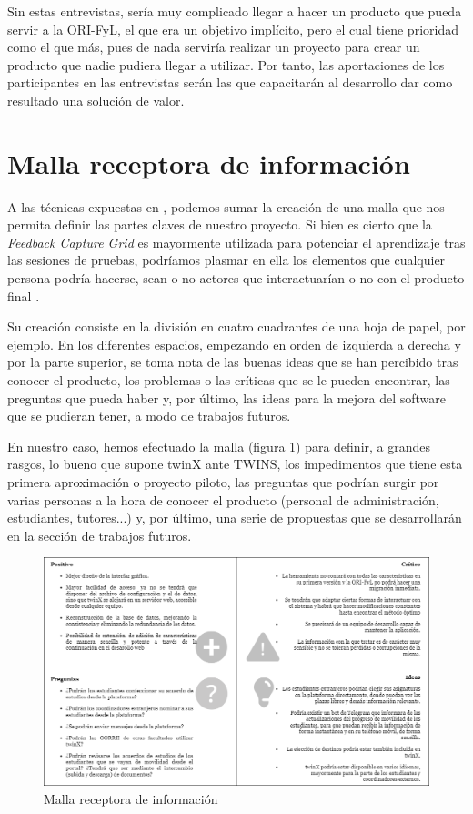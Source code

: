 Sin estas entrevistas, sería muy complicado llegar a hacer un producto que pueda servir a la ORI-FyL, el que era un objetivo implícito, pero el cual tiene prioridad como el que más, pues de nada serviría realizar un proyecto para crear un producto que nadie pudiera llegar a utilizar. Por tanto, las aportaciones de los participantes en las entrevistas serán las que capacitarán al desarrollo dar como resultado una solución de valor.

\section{Malla receptora de información}

A las técnicas expuestas en , podemos sumar la creación de una malla que nos permita definir las partes claves de nuestro proyecto. Si bien es cierto que la \textit{Feedback Capture Grid} es mayormente utilizada para potenciar el aprendizaje tras las sesiones de pruebas, podríamos plasmar en ella los elementos que cualquier persona podría hacerse, sean o no actores que interactuarían o no con el producto final \cite{feedbackCaptureGrid}.

Su creación consiste en la división en cuatro cuadrantes de una hoja de papel, por ejemplo. En los diferentes espacios, empezando en orden de izquierda a derecha y por la parte superior, se toma nota de las buenas ideas que se han percibido tras conocer el producto, los problemas o las críticas que se le pueden encontrar, las preguntas que pueda haber y, por último, las ideas para la mejora del software que se pudieran tener, a modo de trabajos futuros.

En nuestro caso, hemos efectuado la malla (figura \ref{fig:malla}) para definir, a grandes rasgos, lo bueno que supone twinX ante TWINS, los impedimentos que tiene esta primera aproximación o proyecto piloto, las preguntas que podrían surgir por varias personas a la hora de conocer el producto (personal de administración, estudiantes, tutores...) y, por último, una serie de propuestas que se desarrollarán en la sección de trabajos futuros.


\begin{figure}
	\centering
	\includegraphics[width=\textwidth]{img/malla.png}
	\caption{Malla receptora de información}
	\label{fig:malla}
\end{figure}


